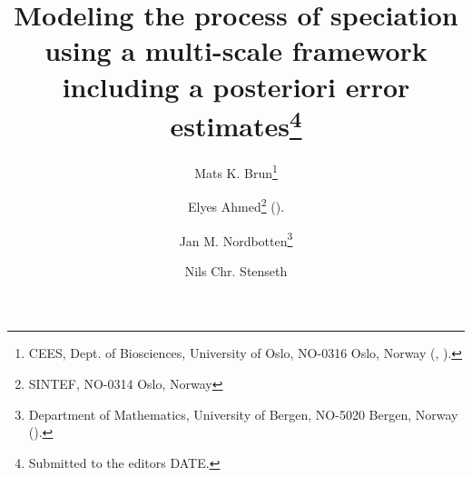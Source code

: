 \newcommand{\etaRKj}{\eta_{\textnormal{R},K,i}}
\newcommand{\etaDFj}{\eta_{\textnormal{DF},K,i}}
\newcommand{\etaghj}{\eta_{g,K,i}}
\newcommand{\etarhj}{\eta_{r,K,i}}

\newcommand{\dist}{\textnormal{dist}}


\newcommand{\creflastconjunction}{, and~}




\title{Modeling the process of speciation using a multi-scale framework including a posteriori error estimates\thanks{Submitted to the editors DATE.
}}

\author{Mats K. Brun\thanks{CEES, Dept. of Biosciences, University of Oslo,  
NO-0316 Oslo, Norway 
  (, ).}
\and Elyes Ahmed\thanks{SINTEF, NO-0314 Oslo, Norway} 
  ().
\and Jan M. Nordbotten\thanks{Department of Mathematics, University of Bergen,
NO-5020 Bergen, Norway 
  ().}
\and Nils Chr. Stenseth\footnotemark[2]}

\usepackage{amsopn}
\DeclareMathOperator{\diag}{diag}


